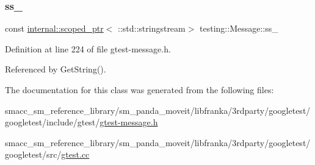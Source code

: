 \subsubsection{\texorpdfstring{ss\+\_\+}{ss\_}}
{\footnotesize\ttfamily const \hyperlink{classtesting_1_1internal_1_1scoped__ptr}{internal\+::scoped\+\_\+ptr}$<$ \+::std\+::stringstream$>$ testing\+::\+Message\+::ss\+\_\+\hspace{0.3cm}{\ttfamily [private]}}



Definition at line 224 of file gtest-\/message.\+h.



Referenced by Get\+String().



The documentation for this class was generated from the following files\+:\begin{DoxyCompactItemize}
\item 
smacc\+\_\+sm\+\_\+reference\+\_\+library/sm\+\_\+panda\+\_\+moveit/libfranka/3rdparty/googletest/googletest/include/gtest/\hyperlink{gtest-message_8h}{gtest-\/message.\+h}\item 
smacc\+\_\+sm\+\_\+reference\+\_\+library/sm\+\_\+panda\+\_\+moveit/libfranka/3rdparty/googletest/googletest/src/\hyperlink{gtest_8cc}{gtest.\+cc}\end{DoxyCompactItemize}
